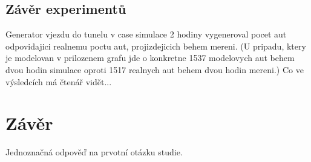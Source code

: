 \documentclass[11pt,a4paper]{article}
\begin{document}
	\subsection{Závěr experimentů}
	Generator vjezdu do tunelu v case simulace 2 hodiny vygeneroval pocet aut odpovidajici realnemu poctu aut, projizdejicich behem mereni. (U pripadu, ktery je modelovan v prilozenem grafu jde o konkretne 1537 modelovych aut behem dvou hodin simulace oproti 1517 realnych aut behem dvou hodin mereni.)
	Co ve výsledcích má čtenář vidět...
\section{Závěr}
Jednoznačná odpověď na prvotní otázku studie.
\end{document}

